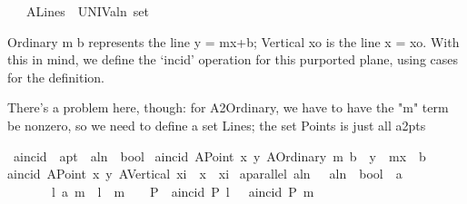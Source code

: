 \begin{isabellebody}
\ \ \ {\isachardoublequoteopen}A{}Lines\ {\isasymequiv}\ {\isacharparenleft}{\kern0pt}UNIV{\isacharcolon}{\kern0pt}{\isacharcolon}{\kern0pt}a{}ln\ set{\isacharparenright}{\kern0pt}{\isachardoublequoteclose}%
\begin{isamarkuptext}%
Ordinary m b represents the line y = mx+b; Vertical xo is the line x = xo. With this in 
mind, we define the  `incid' operation for this purported plane, using cases for the definition.%
\end{isamarkuptext}\isamarkuptrue%
%
\begin{isamarkuptext}%
There's a problem here, though: for A2Ordinary, we have to have the "m" term be nonzero,
so we need to define a set Lines; the set Points is just all a2pts%
\end{isamarkuptext}\isamarkuptrue%
\isamarkupfalse%
\ a{}incid\ {\isacharcolon}{\kern0pt}{\isacharcolon}{\kern0pt}\ {\isachardoublequoteopen}a{}pt\ {\isasymRightarrow}\ a{}ln\ {\isasymRightarrow}\ bool{\isachardoublequoteclose}\ \isanewline
{\isachardoublequoteopen}a{}incid\ {\isacharparenleft}{\kern0pt}A{}Point\ x\ y{\isacharparenright}{\kern0pt}\ {\isacharparenleft}{\kern0pt}A{}Ordinary\ m\ b{\isacharparenright}{\kern0pt}\ {\isacharequal}{\kern0pt}\ {\isacharparenleft}{\kern0pt}y\ {\isacharequal}{\kern0pt}\ m{\isacharasterisk}{\kern0pt}x\ {\isacharplus}{\kern0pt}\ b{\isacharparenright}{\kern0pt}{\isachardoublequoteclose}\ {\isacharbar}{\kern0pt}\isanewline
{\isachardoublequoteopen}a{}incid\ {\isacharparenleft}{\kern0pt}A{}Point\ x\ y{\isacharparenright}{\kern0pt}\ {\isacharparenleft}{\kern0pt}A{}Vertical\ xi{\isacharparenright}{\kern0pt}\ {\isacharequal}{\kern0pt}\ {\isacharparenleft}{\kern0pt}x\ {\isacharequal}{\kern0pt}\ xi{\isacharparenright}{\kern0pt}{\isachardoublequoteclose}\isanewline
\isanewline
{}\isamarkupfalse%
\ a{}parallel{\isacharcolon}{\kern0pt}{\isacharcolon}{\kern0pt}\ {\isachardoublequoteopen}a{}ln\ \ {\isasymRightarrow}\ a{}ln\ {\isasymRightarrow}\ bool{\isachardoublequoteclose}\ {\isacharparenleft}{\kern0pt}\ {\isachardoublequoteopen}a{}{\isacharbar}{\kern0pt}{\isacharbar}{\kern0pt}{\isachardoublequoteclose}\ {}{}{\isacharparenright}{\kern0pt}\isanewline
\ \ \ \ \ \ \ {\isachardoublequoteopen}l\ a{}{\isacharbar}{\kern0pt}{\isacharbar}{\kern0pt}\ m\ {\isasymlongleftrightarrow}\ {\isacharparenleft}{\kern0pt}l\ {\isacharequal}{\kern0pt}\ m\ {\isasymor}\ \ {\isacharparenleft}{\kern0pt}{\isasymforall}\ P{\isachardot}{\kern0pt}\ {\isacharparenleft}{\kern0pt}{\isasymnot}\ a{}incid\ P\ l{\isacharparenright}{\kern0pt}\ \ {\isasymor}\ {\isacharparenleft}{\kern0pt}{\isasymnot}a{}incid\ P\ m{\isacharparenright}{\kern0pt}{\isacharparenright}{\kern0pt}{\isacharparenright}{\kern0pt}{\isachardoublequoteclose}%

\end{isabellebody}
